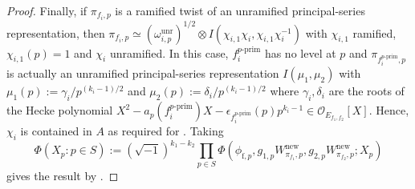 \documentclass{amsart}
\theoremstyle{plain}
\theoremstyle{plain}
\theoremstyle{remark}
\begin{document}
\begin{proof}
    Finally, if $\pi_{f_i,p}$ is a ramified twist of an unramified principal-series representation, then $\pi_{f_i,p}\simeq (\omega_{i,p}^\mathrm{unr})^{1/2}\otimes I(\chi_{i,1}\chi_i,\chi_{i,1}\chi_i^{-1})$ with $\chi_{i,1}$ ramified, $\chi_{i,1}(p)=1$ and $\chi_i$ unramified. In this case, $f_i^{p\text{-}\mathrm{prim}}$ has no level at $p$ and
    $\pi_{f_i^{p\text{-}\mathrm{prim}},p}$ is actually an unramified principal-series representation $I(\mu_1,\mu_2)$ with $\mu_1(p):=\gamma_i/p^{(k_i-1)/2}$ and $\mu_2(p):=\delta_i /p^{(k_i-1)/2}$ where $\gamma_i,\delta_i$ are the roots of the Hecke polynomial $X^2-a_p(f_i^{p\text{-}\mathrm{prim}})X-\epsilon_{f_i^{p\text{-}\mathrm{prim}}}(p)p^{k_i-1}\in \mathcal{O}_{E_{f_1,f_2}}[X]$. Hence, $\chi_i$ is contained in $A$ as required for . Taking 
    $$\Phi(X_p:p\in S):=(\sqrt{-1})^{k_1-k_2}\prod_{p\in S}\Phi(\phi_{\mathrm{f},p},g_{1,p}W_{\pi_{f_1},p}^\mathrm{new},g_{2,p}W_{\pi_{f_2},p}^\mathrm{new};X_p)$$
    gives the result by .
    \end{proof}
  


\address{Mathematics Institute, Zeeman Building, University of Warwick, Coventry CV4 7AL,
England}

\end{document}

